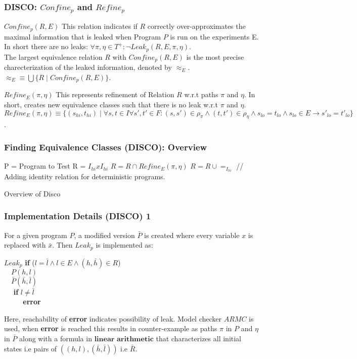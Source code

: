 \documentclass{beamer}
\begin{document}
\begin{frame}
\frametitle{DISCO: $Confine_{p}$ and $Refine_{p}$}
\begin{block}{$Confine_{p}(R, E)$}
This relation indicates if $R$ correctly over-approximates the maximal information that is leaked when Program $P$ is run on the experiments E.\\
In short there are no leaks:
$\forall \pi, \eta \in T^{+} : \neg Leak_{p}(R, E, \pi, \eta)$.\\
The largest equivalence relation $R$ with $Confine_{p}(R, E)$ is the most precise charecterization of the leaked information, denoted by \textbf{$\approx_{E}$}.\\
$\approx_{E} \equiv \bigcup\{R \mid Confine_{p}(R, E)\}$.
\end{block}
\begin{block}{$Refine_{E}(\pi, \eta)$}
This represents refinement of Relation $R$ w.r.t paths $\pi$ and $\eta$. In short, creates new equivalence classes such that there is no leak w.r.t $\pi$ and $\eta$.\\
$Refine_{E}(\pi, \eta) \equiv \{(s_{hi}, t_{hi}) \mid \forall s, t \in I \forall s', t' \in F : (s, s') \in \rho_{\pi} \land (t, t') \in \rho_{\eta} \land s_{lo} = t_{lo} \land s_{lo} \in E \to s'_{lo} = t'_{lo}\}$.
\end{block}
\end{frame}

\begin{frame}
\frametitle{Finding Equivalence Classes (DISCO): Overview}
\begin{algorithm}[H]
\begin{algorithmic}[1]
\STATE P = Program to Test
\STATE R = $I_{hi} x I_{hi}$
\STATE $R = R \cap Refine_{E}(\pi, \eta)$
\ENDWHILE
\STATE $R = R  \cup =_{I_{hi}}$ // Adding identity relation for deterministic programs.
\end{algorithmic}
\caption{Overview of Disco}
\label{alg:seq}
\end{algorithm}
\end{frame}

\begin{frame}
\frametitle{Implementation Details (DISCO) 1}
For a given program $P$, a modified version $\bar{P}$ is created where every variable $x$ is replaced with $\bar{x}$. Then $Leak_{p}$ is implemented as:
\begin{block}{$Leak_{p}$}
\textbf{if} ($l=\bar{l} \land l \in E \land (h,\bar{h}) \in R$) \\
$\quad P(h, l)$\\
$\quad \bar{P}(\bar{h}, \bar{l})$\\
$\quad$ \textbf{if} $l \neq \bar{l}$\\
$\quad$ $\quad$ \textbf{error}
\end{block}
Here, reachability of \textbf{error} indicates possibility of leak. Model checker $ARMC$ is used, when \textbf{error} is reached this results in counter-example as paths $\pi$ in $P$ and $\eta$ in $\bar{P}$ along with a formula in $\textbf{linear arithmetic}$ that characterizes all initial states i.e pairs of $((h, l), (\bar{h}, \bar{l}))$ i.e $\bar{R}$.
\end{frame}
\end{document}
